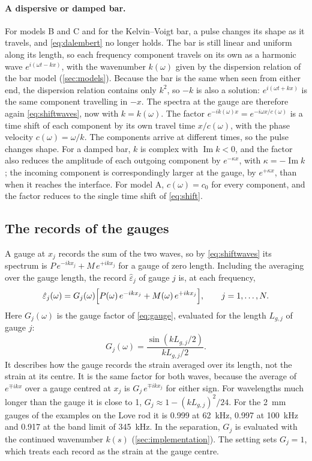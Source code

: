 \documentclass[11pt,a4paper,numbers=noenddot,abstract=true]{scrartcl}
\newcommand{\code}[1]{\texttt{\detokenize{#1}}}
\DeclareMathOperator{\Imag}{Im}
\begin{document}
\paragraph{A dispersive or damped bar.} For models B and C and for the Kelvin--Voigt bar, a pulse changes its shape
as it travels, and \cref{eq:dalembert} no longer holds. The bar is still linear and uniform along its length,
so each frequency component travels on its own as a harmonic wave $e^{i(\omega t - kx)}$, with the wavenumber
$k(\omega)$ given by the dispersion relation of the bar model (\cref{sec:models}). Because the bar is the same when
seen from either end, the dispersion relation contains only $k^2$, so $-k$ is also a solution: $e^{i(\omega t + kx)}$
is the same component travelling in $-x$. The spectra at the gauge are therefore again \cref{eq:shiftwaves}, now
with $k = k(\omega)$. The factor $e^{-ik(\omega)x} = e^{-i\omega x / c(\omega)}$ is a time shift of each component
by its own travel time $x / c(\omega)$, with the phase velocity $c(\omega) = \omega / k$. The components arrive at
different times, so the pulse changes shape. For a damped bar, $k$ is complex with $\Imag k < 0$, and the factor
also reduces the amplitude of each outgoing component by $e^{-\kappa x}$, with $\kappa = -\Imag k$; the incoming
component is correspondingly larger at the gauge, by $e^{+\kappa x}$, than when it reaches the interface. For
model A, $c(\omega) = c_0$ for every component, and the factor reduces to the single time shift of
\cref{eq:shift}.

\subsection{The records of the gauges}
\label{sec:gaugemodel}

A gauge at $x_j$ records the sum of the two waves, so by \cref{eq:shiftwaves} its spectrum is
$P\, e^{-ikx_j} + M\, e^{+ikx_j}$ for a gauge of zero length. Including the averaging over the gauge length, the
record $\hat\varepsilon_j$ of gauge $j$ is, at each frequency,
\begin{equation}
  \hat\varepsilon_j(\omega) = G_j(\omega)\Bigl[P(\omega)\, e^{-ik x_j} + M(\omega)\, e^{+ik x_j}\Bigr],
  \qquad j = 1, \dots, N.
  \label{eq:gaugemodel}
\end{equation}
Here $G_j(\omega)$ is the gauge factor of \cref{eq:gauge}, evaluated for the length $L_{g,j}$ of gauge $j$:
\begin{equation*}
  G_j(\omega) = \frac{\sin(k L_{g,j} / 2)}{k L_{g,j} / 2}.
\end{equation*}
It describes how the gauge records the strain averaged over its length, not the strain at its centre. It is the
same factor for both waves, because the average of $e^{\mp ikx}$ over a gauge centred at $x_j$ is
$G_j\, e^{\mp ikx_j}$ for either sign. For wavelengths much longer than the gauge it is close to 1,
$G_j \approx 1 - (k L_{g,j})^2 / 24$. For the 2~mm gauges of the examples on the Love rod it is 0.999 at 62~kHz,
0.997 at 100~kHz and 0.917 at the band limit of 345~kHz. In the separation, $G_j$ is evaluated with the continued
wavenumber $k(s)$ (\cref{sec:implementation}). The setting \code{gauge_length_correction = false} sets
$G_j = 1$, which treats each record as the strain at the gauge centre.
\end{document}
